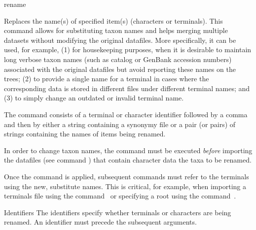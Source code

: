 \begin{command}{rename}{}

	
	\begin{poydescription} 
        Replaces the name(s) of specified item(s) (characters or terminals). This command allows 
        for substituting taxon names and helps merging multiple datasets without modifying the original
        datafiles. More specifically, it can be used, for example, (1) for housekeeping purposes,
        when it is desirable to maintain long verbose taxon names (such as catalog or GenBank
        accession numbers) associated with the original datafiles but avoid reporting these 
        names on the trees; (2) to provide a single name for a terminal in cases where the corresponding
        data is stored in different files under different terminal names; and (3) to simply change an
        outdated or invalid terminal name.
        
        The command consists of a terminal or character identifier followed by a comma and then by
        either a string containing a synonymy file or a pair (or pairs) of strings containing the names of
        items being renamed.
	\end{poydescription}  
          
	\begin{statement}
            In order to change taxon names, the command  must be
            executed \emph{before} importing the datafiles (see command )
            that contain character data the taxa to be renamed.
          \end{statement}
          
          \begin{statement}
            Once the command  is applied, subsequent commands 
            must refer to the terminals using the new, substitute names. This is critical, for example,
            when importing a terminals file using the command~ or specifying
             a root using the command~.
          \end{statement}
          
          \begin{arguments}
		\begin{argumentgroup}{Identifiers}
		{The identifiers specify whether terminals or characters are being renamed. An identifier
		must precede the subsequent arguments.}
		

\end{argumentgroup}
\end{arguments}
\end{command}
